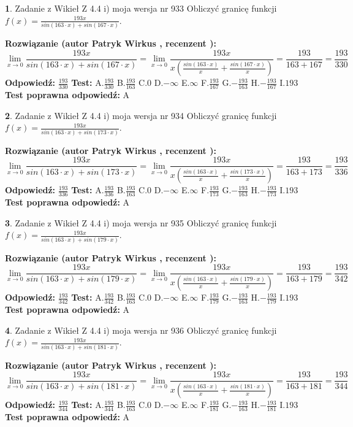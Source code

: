 \documentclass[12pt, a4paper]{article}
\theoremstyle{definition} %
\newtheorem{zad}{}
\newcommand{\zadStart}[1]{\begin{zad}#1\newline}
\newcommand{\zadStop}{\end{zad}}
\newcommand{\rozwStart}[2]{\noindent \textbf{Rozwiązanie (autor #1 , recenzent #2): }\newline}
\newcommand{\rozwStop}{\newline}
\newcommand{\odpStart}{\noindent \textbf{Odpowiedź:}\newline}
\newcommand{\odpStop}{\newline}
\newcommand{\testStart}{\noindent \textbf{Test:}\newline}
\newcommand{\testStop}{\newline}
\newcommand{\kluczStart}{\noindent \textbf{Test poprawna odpowiedź:}\newline}
\newcommand{\kluczStop}{\newline}
\begin{document}
\zadStart{Zadanie z Wikieł Z 4.4 i) moja wersja nr 933}
Obliczyć granicę funkcji $f(x)=\frac{193x}{sin(163\cdot x) +sin(167\cdot x)}$.
\zadStop
\rozwStart{Patryk Wirkus}{}
$$\lim\limits_{x\to 0}\frac{193x}{sin(163\cdot x) +sin(167\cdot x)}=\lim\limits_{x\to 0}\frac{193x}{x(\frac{sin(163\cdot x)}{x}+\frac{sin(167\cdot x)}{x})}=\frac{193}{163+167} = \frac{193}{330}$$
\rozwStop
\odpStart
$\frac{193}{330}$
\odpStop
\testStart
A.$\frac{193}{330}$
B.$\frac{193}{163}$
C.$0$
D.$-\infty$
E.$\infty$
F.$\frac{193}{167}$
G.$-\frac{193}{163}$
H.$-\frac{193}{167}$
I.$193$
\testStop
\kluczStart
A
\kluczStop



\zadStart{Zadanie z Wikieł Z 4.4 i) moja wersja nr 934}
Obliczyć granicę funkcji $f(x)=\frac{193x}{sin(163\cdot x) +sin(173\cdot x)}$.
\zadStop
\rozwStart{Patryk Wirkus}{}
$$\lim\limits_{x\to 0}\frac{193x}{sin(163\cdot x) +sin(173\cdot x)}=\lim\limits_{x\to 0}\frac{193x}{x(\frac{sin(163\cdot x)}{x}+\frac{sin(173\cdot x)}{x})}=\frac{193}{163+173} = \frac{193}{336}$$
\rozwStop
\odpStart
$\frac{193}{336}$
\odpStop
\testStart
A.$\frac{193}{336}$
B.$\frac{193}{163}$
C.$0$
D.$-\infty$
E.$\infty$
F.$\frac{193}{173}$
G.$-\frac{193}{163}$
H.$-\frac{193}{173}$
I.$193$
\testStop
\kluczStart
A
\kluczStop



\zadStart{Zadanie z Wikieł Z 4.4 i) moja wersja nr 935}
Obliczyć granicę funkcji $f(x)=\frac{193x}{sin(163\cdot x) +sin(179\cdot x)}$.
\zadStop
\rozwStart{Patryk Wirkus}{}
$$\lim\limits_{x\to 0}\frac{193x}{sin(163\cdot x) +sin(179\cdot x)}=\lim\limits_{x\to 0}\frac{193x}{x(\frac{sin(163\cdot x)}{x}+\frac{sin(179\cdot x)}{x})}=\frac{193}{163+179} = \frac{193}{342}$$
\rozwStop
\odpStart
$\frac{193}{342}$
\odpStop
\testStart
A.$\frac{193}{342}$
B.$\frac{193}{163}$
C.$0$
D.$-\infty$
E.$\infty$
F.$\frac{193}{179}$
G.$-\frac{193}{163}$
H.$-\frac{193}{179}$
I.$193$
\testStop
\kluczStart
A
\kluczStop



\zadStart{Zadanie z Wikieł Z 4.4 i) moja wersja nr 936}
Obliczyć granicę funkcji $f(x)=\frac{193x}{sin(163\cdot x) +sin(181\cdot x)}$.
\zadStop
\rozwStart{Patryk Wirkus}{}
$$\lim\limits_{x\to 0}\frac{193x}{sin(163\cdot x) +sin(181\cdot x)}=\lim\limits_{x\to 0}\frac{193x}{x(\frac{sin(163\cdot x)}{x}+\frac{sin(181\cdot x)}{x})}=\frac{193}{163+181} = \frac{193}{344}$$
\rozwStop
\odpStart
$\frac{193}{344}$
\odpStop
\testStart
A.$\frac{193}{344}$
B.$\frac{193}{163}$
C.$0$
D.$-\infty$
E.$\infty$
F.$\frac{193}{181}$
G.$-\frac{193}{163}$
H.$-\frac{193}{181}$
I.$193$
\testStop
\kluczStart
A
\kluczStop
\end{document}
